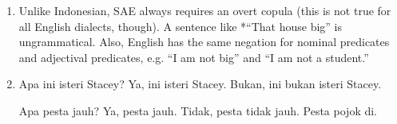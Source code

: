 \documentclass[12pt]{article}
\begin{document}
\begin{enumerate}
\begin{enumerate}
\item Unlike Indonesian, SAE always requires an overt copula (this is not true for all English dialects, though). A sentence like *``That house big'' is ungrammatical. Also, English has the same negation for nominal predicates and adjectival predicates, e.g. ``I am not big'' and ``I am not a student.''

\item
\begin{exe}
\ex\label{par3} \begin{xlist}
\ex\label{par3a}
Apa ini isteri Stacey?
\ex\label{par3b}
Ya, ini isteri Stacey.
\ex\label{par3c}
Bukan, ini bukan isteri Stacey.
\end{xlist}\end{exe}

\begin{exe}
\ex\label{par4} \begin{xlist}
\ex\label{par4a}
Apa pesta jauh?
\ex\label{par4b}
Ya, pesta jauh.
\ex\label{par4c}
Tidak, pesta tidak jauh. Pesta pojok di.
\end{xlist} \end{exe}

\end{enumerate}

\end{enumerate}
\end{document}
